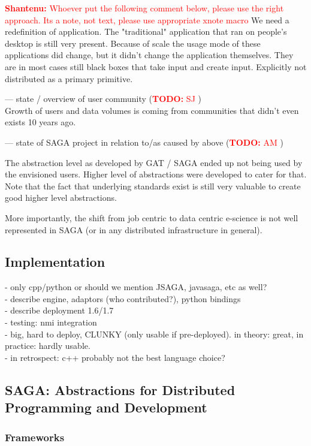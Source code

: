 \documentclass{article}
\newcommand{\B}[1]{\textbf{#1}}
\newcommand{\todo}[1]{{\textcolor{red}{\B{TODO:} #1 }}}
\newcommand{\jhanote}[1]{{\textcolor{red}{     \B{Shantenu:} #1 }}}
\newcommand{\jhanote}[1]{}
\begin{document}
\jhanote{Whoever put the following comment below, please use the right
  approach. Its a note, not text, please use appropriate xnote macro} We need a
redefinition of application. The "traditional" application that ran on
people's desktop is still very present.  Because of scale the usage
mode of these applications did change, but it didn't change the
application themselves.  They are in most cases still black boxes that
take input and create input.  Explicitly not distributed as a primary
primitive.

 --- state / overview of user community (\todo{SJ})\\
 
 Growth of users and data volumes is coming from communities that
 didn't even exists 10 years ago.
 
 
 --- state of SAGA project in relation to/as caused by above (\todo{AM})

 The abstraction level as developed by GAT / SAGA ended up not being
 used by the envisioned users.  Higher level of abstractions were
 developed to cater for that. Note that the fact that underlying
 standards exist is still very valuable to create good higher level
 abstractions.

 More importantly, the shift from job centric to data centric
 e-science is not well represented in SAGA (or in any distributed
 infrastructure in general).

\subsection{Implementation}
 - only cpp/python or should we mention JSAGA, javasaga, etc as well?\\
 - describe engine, adaptors (who contributed?), python bindings\\
 - describe deployment 1.6/1.7 \\
 - testing: nmi integration \\
 - big, hard to deploy, CLUNKY (only usable if pre-deployed). in theory: great, in practice: hardly usable. \\
 - in retrospect: c++ probably not the best language choice? \\

\subsection{SAGA: Abstractions for Distributed Programming and
  Development}

\subsubsection{Frameworks}
\end{document}
